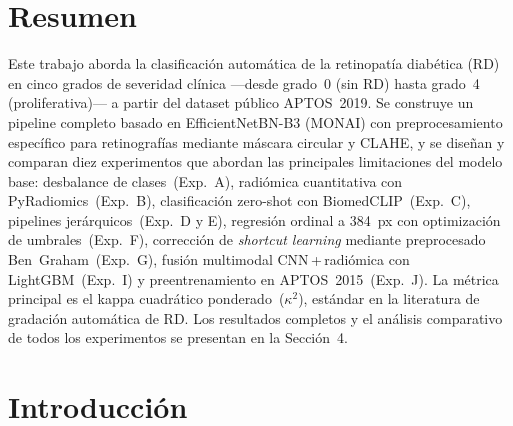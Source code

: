 \documentclass[12pt, a4paper]{article}
\begin{document}
\newpage
{}

\section*{Resumen}

Este trabajo aborda la clasificación automática de la retinopatía diabética (RD) en
cinco grados de severidad clínica ---desde grado~0 (sin RD) hasta grado~4
(proliferativa)--- a partir del dataset público APTOS~2019. Se construye un pipeline
completo basado en EfficientNetBN-B3 (MONAI) con preprocesamiento específico para
retinografías mediante máscara circular y CLAHE, y se diseñan y comparan diez
experimentos que abordan las principales limitaciones del modelo base: desbalance de
clases~(Exp.~A), radiómica cuantitativa con PyRadiomics~(Exp.~B), clasificación
zero-shot con BiomedCLIP~(Exp.~C), pipelines jerárquicos~(Exp.~D y E), regresión
ordinal a 384~px con optimización de umbrales~(Exp.~F), corrección de
\textit{shortcut learning} mediante preprocesado Ben~Graham~(Exp.~G), fusión
multimodal CNN\,+\,radiómica con LightGBM~(Exp.~I) y preentrenamiento en
APTOS~2015~(Exp.~J). La métrica principal es el kappa cuadrático ponderado~($\kappa^2$),
estándar en la literatura de gradación automática de RD. Los resultados completos
y el análisis comparativo de todos los experimentos se presentan en la Sección~4.

\newpage
{}
\tableofcontents

\newpage
{}

\section{Introducción}
\end{document}
